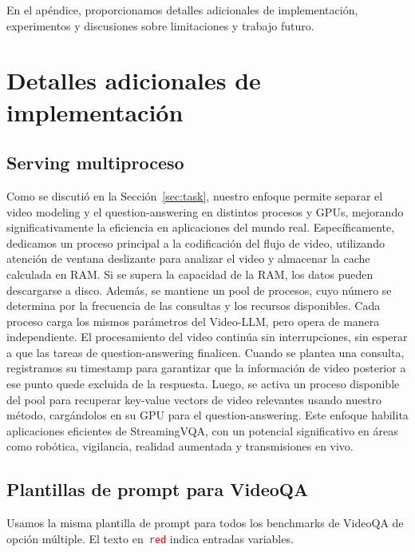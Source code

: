 
\appendix

En el apéndice, proporcionamos detalles adicionales de implementación, experimentos y discusiones sobre limitaciones y trabajo futuro.

\section{Detalles adicionales de implementación}

\subsection{Serving multiproceso}

Como se discutió en la Sección~\ref{sec:task}, nuestro enfoque permite separar el video modeling y el question-answering en distintos procesos y GPUs, mejorando significativamente la eficiencia en aplicaciones del mundo real. Específicamente, dedicamos un proceso principal a la codificación del flujo de video, utilizando atención de ventana deslizante para analizar el video y almacenar la cache calculada en RAM. Si se supera la capacidad de la RAM, los datos pueden descargarse a disco. Además, se mantiene un pool de procesos, cuyo número se determina por la frecuencia de las consultas y los recursos disponibles. Cada proceso carga los mismos parámetros del Video-LLM, pero opera de manera independiente. El procesamiento del video continúa sin interrupciones, sin esperar a que las tareas de question-answering finalicen. Cuando se plantea una consulta, registramos su timestamp para garantizar que la información de video posterior a ese punto quede excluida de la respuesta. Luego, se activa un proceso disponible del pool para recuperar key-value vectors de video relevantes usando nuestro método, cargándolos en su GPU para el question-answering. Este enfoque habilita aplicaciones eficientes de StreamingVQA, con un potencial significativo en áreas como robótica, vigilancia, realidad aumentada y transmisiones en vivo.

\subsection{Plantillas de prompt para VideoQA}

Usamos la misma plantilla de prompt para todos los benchmarks de VideoQA de opción múltiple. El texto en~\texttt{\textcolor{red}{red}} indica entradas variables.

